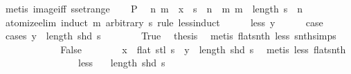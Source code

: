 \begin{isabellebody}
\ {\isacharparenleft}metis\ image{\isacharunderscore}iff\ sset{\isacharunderscore}range{\isacharparenright}\isanewline
\ \ \isamarkupfalse%
\ {\isacartoucheopen}{\isacharquery}P{\isacartoucheclose}\ \isamarkupfalse%
\ n\ m{\isacharprime}\ \ {\isachardoublequoteopen}x\ {\isacharequal}\ s\ {\isacharbang}{\isacharbang}\ n\ {\isacharbang}\ m{\isacharprime}{\isachardoublequoteclose}\ {\isachardoublequoteopen}m{\isacharprime}\ {\isacharless}\ length\ {\isacharparenleft}s\ {\isacharbang}{\isacharbang}\ n{\isacharparenright}{\isachardoublequoteclose}\isanewline
\ \ \isamarkupfalse%
\ {\isacharparenleft}atomize{\isacharunderscore}elim{\isacharcomma}\ induct\ m\ arbitrary{\isacharcolon}\ s\ rule{\isacharcolon}\ less{\isacharunderscore}induct{\isacharparenright}\isanewline
\ \ \ \ \isamarkupfalse%
\ {\isacharparenleft}less\ y{\isacharparenright}\isanewline
\ \ \ \ \isamarkupfalse%
\ {\isacharquery}case\isanewline
\ \ \ \ \isamarkupfalse%
\ {\isacharparenleft}cases\ {\isachardoublequoteopen}y\ {\isacharless}\ length\ {\isacharparenleft}shd\ s{\isacharparenright}{\isachardoublequoteclose}{\isacharparenright}\isanewline
\ \ \ \ \ \ \isamarkupfalse%
\ True\ \isamarkupfalse%
\ {\isacharquery}thesis\ \isamarkupfalse%
\ {\isacharparenleft}metis\ flat{\isacharunderscore}snth\ less{\isacharparenleft}{}{\isacharcomma}{}{\isacharparenright}\ snth{\isachardot}simps{\isacharparenleft}{}{\isacharparenright}{\isacharparenright}\isanewline
\ \ \ \ \isamarkupfalse%
\isanewline
\ \ \ \ \ \ \isamarkupfalse%
\ False\isanewline
\ \ \ \ \ \ \isamarkupfalse%
\ {\isachardoublequoteopen}x\ {\isacharequal}\ flat\ {\isacharparenleft}stl\ s{\isacharparenright}\ {\isacharbang}{\isacharbang}\ {\isacharparenleft}y\ {\isacharminus}\ length\ {\isacharparenleft}shd\ s{\isacharparenright}{\isacharparenright}{\isachardoublequoteclose}\ \isamarkupfalse%
\ {\isacharparenleft}metis\ less{\isacharparenleft}{}{\isacharcomma}{}{\isacharparenright}\ flat{\isacharunderscore}snth{\isacharparenright}\isanewline
\ \ \ \ \ \ \isamarkupfalse%
\isanewline
\ \ \ \ \ \ \isacommand{{\isacharbraceleft}}\isamarkupfalse%
\ \isamarkupfalse%
\ less{\isacharparenleft}{}{\isacharparenright}\ \isamarkupfalse%
\ {\isacharasterisk}{\isacharcolon}\ {\isachardoublequoteopen}length\ {\isacharparenleft}shd\ s{\isacharparenright}\ {\isachargreater}\ {}{\isachardoublequoteclose}\ \isamarkupfalse%

\end{isabellebody}
